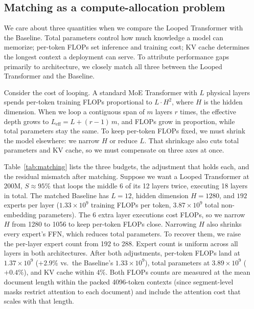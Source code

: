 \documentclass[]{bytedance_seed}
\theoremstyle{definition}
\theoremstyle{remark}
\begin{document}
\subsection{Matching as a compute-allocation problem}
\label{sec:design-setup}

We care about three quantities when we compare the Looped Transformer with the Baseline.
%
Total parameters control how much knowledge a model can memorize; per-token FLOPs set inference and training cost; KV cache determines the longest context a deployment can serve.
%
To attribute performance gaps primarily to architecture, we closely match all three between the Looped Transformer and the Baseline.
%

Consider the cost of looping.
%
A standard MoE Transformer with $L$ physical layers spends per-token training FLOPs proportional to $L \cdot H^2$, where $H$ is the hidden dimension.
%
When we loop a contiguous span of $m$ layers $r$ times, the effective depth grows to $L_{\mathrm{eff}} = L + (r{-}1)\,m$, and FLOPs grow in proportion, while total parameters stay the same.
%
To keep per-token FLOPs fixed, we must shrink the model elsewhere: we narrow $H$ or reduce $L$.
%
That shrinkage also cuts total parameters and KV cache, so we must compensate on three axes at once.
%

Table~\ref{tab:matching} lists the three budgets, the adjustment that holds each, and the residual mismatch after matching.
%
Suppose we want a Looped Transformer at 200M, $S \approx 95\%$ that loops the middle 6 of its 12 layers twice, executing 18 layers in total.
%
The matched Baseline has $L = 12$, hidden dimension $H = 1280$, and $192$ experts per layer ($1.33 \times 10^{9}$ training FLOPs per token, $3.87 \times 10^{9}$ total non-embedding parameters).
%
The 6 extra layer executions cost FLOPs, so we narrow $H$ from 1280 to 1056 to keep per-token FLOPs close.
%
Narrowing $H$ also shrinks every expert's FFN, which reduces total parameters.
%
To recover them, we raise the per-layer expert count from 192 to 288.
%
Expert count is uniform across all layers in both architectures.
%
After both adjustments, per-token FLOPs land at $1.37 \times 10^{9}$ ($+2.9\%$ vs.\ the Baseline's $1.33 \times 10^{9}$), total parameters at $3.89 \times 10^{9}$ ($+0.4\%$), and KV cache within $4\%$.
%
Both FLOPs counts are measured at the mean document length within the packed 4096-token contexts (since segment-level masks restrict attention to each document) and include the attention cost that scales with that length.
%
\end{document}
